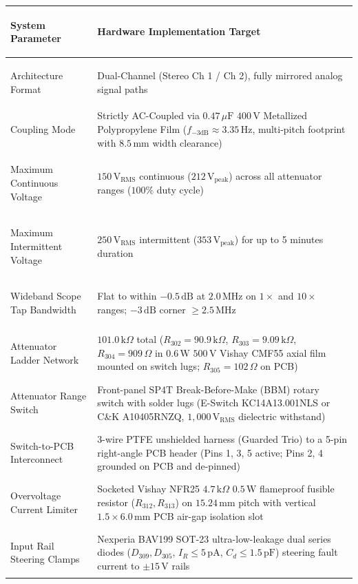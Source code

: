\documentclass[11pt, letterpaper]{article}
\begin{document}
\begin{table}[H]
    \centering
    \small
    \setlength{\tabcolsep}{4pt}
    \begin{tabularx}{\linewidth}{@{} >{\bfseries\raggedright\arraybackslash}p{4.3cm} L @{}}
        \toprule
        System Parameter & Hardware Implementation Target \\
        \midrule
        Architecture Format & Dual-Channel (Stereo Ch 1 / Ch 2), fully mirrored analog signal paths \\
        Coupling Mode & Strictly AC-Coupled via $0.47\,\mu\text{F}$ $400\,\text{V}$ Metallized Polypropylene Film ($f_{-3\text{dB}} \approx 3.35\,\text{Hz}$, multi-pitch footprint with $8.5\,\text{mm}$ width clearance) \\
        Maximum Continuous Voltage & $150\,\text{V}_{\text{RMS}}$ continuous ($212\,\text{V}_{\text{peak}}$) across all attenuator ranges ($100\%$ duty cycle) \\
        Maximum Intermittent Voltage & $250\,\text{V}_{\text{RMS}}$ intermittent ($353\,\text{V}_{\text{peak}}$) for up to 5 minutes duration \\
        Wideband Scope Tap Bandwidth & Flat to within $-0.5\,\text{dB}$ at $2.0\,\text{MHz}$ on $1\times$ and $10\times$ ranges; $-3\,\text{dB}$ corner $\ge 2.5\,\text{MHz}$ \\
        Attenuator Ladder Network & $101.0\,\text{k}\Omega$ total ($R_{302}=90.9\,\text{k}\Omega$, $R_{303}=9.09\,\text{k}\Omega$, $R_{304}=909\,\Omega$ in $0.6\,\text{W}$ $500\,\text{V}$ Vishay CMF55 axial film mounted on switch lugs; $R_{305}=102\,\Omega$ on PCB) \\
        Attenuator Range Switch & Front-panel SP4T Break-Before-Make (BBM) rotary switch with solder lugs (E-Switch KC14A13.001NLS or C\&K A10405RNZQ, $1,000\,\text{V}_{\text{RMS}}$ dielectric withstand) \\
        Switch-to-PCB Interconnect & 3-wire PTFE unshielded harness (Guarded Trio) to a 5-pin right-angle PCB header (Pins 1, 3, 5 active; Pins 2, 4 grounded on PCB and de-pinned) \\
        Overvoltage Current Limiter & Socketed Vishay NFR25 $4.7\,\text{k}\Omega$ $0.5\,\text{W}$ flameproof fusible resistor ($R_{312}, R_{313}$) on $15.24\,\text{mm}$ pitch with vertical $1.5 \times 6.0\,\text{mm}$ PCB air-gap isolation slot \\
        Input Rail Steering Clamps & Nexperia BAV199 SOT-23 ultra-low-leakage dual series diodes ($D_{309}, D_{305}$, $I_R \le 5\,\text{pA}$, $C_d \le 1.5\,\text{pF}$) steering fault current to $\pm 15\,\text{V}$ rails \\

\end{tabularx}
\end{table}
\end{document}
